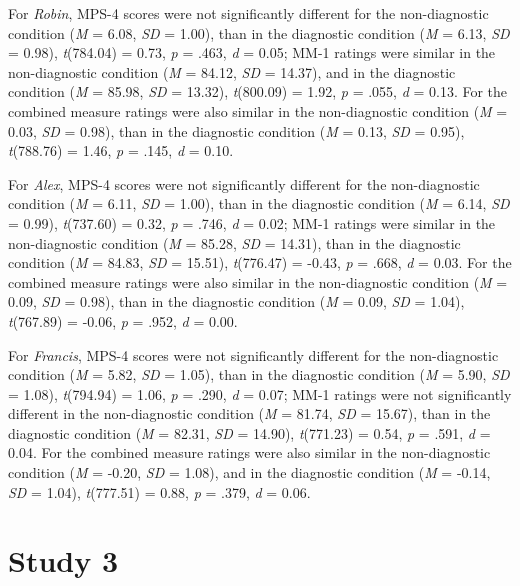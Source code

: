 \documentclass[
  american,
  man,mask,floatsintext]{apa6}
\begin{document}
For \emph{Robin}, MPS-4 scores were not significantly different for the non-diagnostic condition (\emph{M} = 6.08, \emph{SD} = 1.00), than in the diagnostic condition (\emph{M} = 6.13, \emph{SD} = 0.98), \emph{t}(784.04) = 0.73, \emph{p} = .463, \emph{d} = 0.05; MM-1 ratings were similar in the non-diagnostic condition (\emph{M} = 84.12, \emph{SD} = 14.37), and in the diagnostic condition (\emph{M} = 85.98, \emph{SD} = 13.32), \emph{t}(800.09) = 1.92, \emph{p} = .055, \emph{d} = 0.13. For the combined measure ratings were also similar in the non-diagnostic condition (\emph{M} = 0.03, \emph{SD} = 0.98), than in the diagnostic condition (\emph{M} = 0.13, \emph{SD} = 0.95), \emph{t}(788.76) = 1.46, \emph{p} = .145, \emph{d} = 0.10.

For \emph{Alex}, MPS-4 scores were not significantly different for the non-diagnostic condition (\emph{M} = 6.11, \emph{SD} = 1.00), than in the diagnostic condition (\emph{M} = 6.14, \emph{SD} = 0.99), \emph{t}(737.60) = 0.32, \emph{p} = .746, \emph{d} = 0.02; MM-1 ratings were similar in the non-diagnostic condition (\emph{M} = 85.28, \emph{SD} = 14.31), than in the diagnostic condition (\emph{M} = 84.83, \emph{SD} = 15.51), \emph{t}(776.47) = -0.43, \emph{p} = .668, \emph{d} = 0.03. For the combined measure ratings were also similar in the non-diagnostic condition (\emph{M} = 0.09, \emph{SD} = 0.98), than in the diagnostic condition (\emph{M} = 0.09, \emph{SD} = 1.04), \emph{t}(767.89) = -0.06, \emph{p} = .952, \emph{d} = 0.00.

For \emph{Francis}, MPS-4 scores were not significantly different for the non-diagnostic condition (\emph{M} = 5.82, \emph{SD} = 1.05), than in the diagnostic condition (\emph{M} = 5.90, \emph{SD} = 1.08), \emph{t}(794.94) = 1.06, \emph{p} = .290, \emph{d} = 0.07; MM-1 ratings were not significantly different in the non-diagnostic condition (\emph{M} = 81.74, \emph{SD} = 15.67), than in the diagnostic condition (\emph{M} = 82.31, \emph{SD} = 14.90), \emph{t}(771.23) = 0.54, \emph{p} = .591, \emph{d} = 0.04. For the combined measure ratings were also similar in the non-diagnostic condition (\emph{M} = -0.20, \emph{SD} = 1.08), and in the diagnostic condition (\emph{M} = -0.14, \emph{SD} = 1.04), \emph{t}(777.51) = 0.88, \emph{p} = .379, \emph{d} = 0.06.

\newpage

\newpage

\hypertarget{study-3}{%
\section{Study 3}\label{study-3}}
\end{document}
